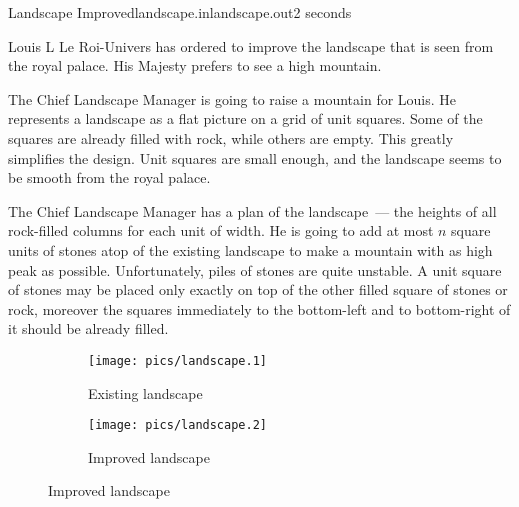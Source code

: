 \begin{problem}{Landscape Improved}{landscape.in}{landscape.out}{2 seconds}


Louis L Le Roi-Univers has ordered to improve the landscape that is seen from the royal palace.
His Majesty prefers to see a high mountain.

The Chief Landscape Manager is going to raise a mountain for Louis.
He represents a landscape as a flat picture on a grid of unit squares.
Some of the squares are already filled with rock, while others are empty.
This greatly simplifies the design. Unit squares are small enough,
and the landscape seems to be smooth from the royal palace.

The Chief Landscape Manager has a plan of the landscape~--- 
the heights of all rock-filled columns for each unit of width.
He is going to add at most $n$ square units of stones atop of the existing landscape
to make a mountain with as high peak as possible. Unfortunately, piles of
stones are quite unstable. A unit square of stones may be placed only exactly on top of the other filled
square of stones or rock, moreover the squares immediately to the bottom-left and to bottom-right
of it should be already filled.

%

\begin{figure}[h!]
\centering
\begin{subfigure}{0.5\textwidth}
  \centering
  \texttt{[image: pics/landscape.1]}
  \caption*{Existing landscape}
\end{subfigure}%
\begin{subfigure}{0.5\textwidth}
  \centering
  \texttt{[image: pics/landscape.2]}
  \caption*{Improved landscape}
\end{subfigure}%
\end{figure}


\end{problem}
